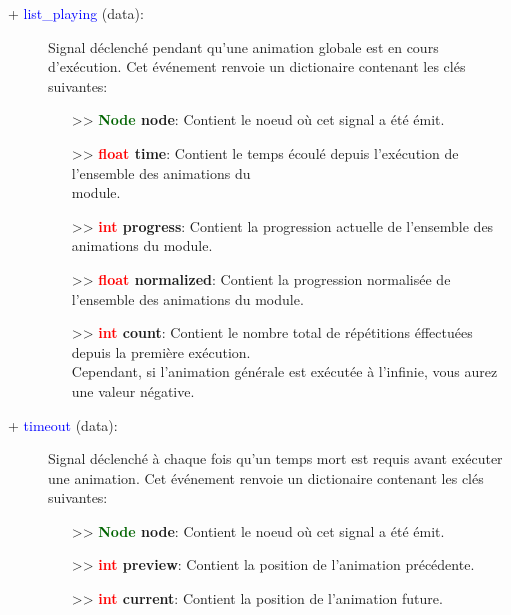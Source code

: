 \documentclass[a4paper, 11pt]{article}
\begin{document}
	\begin{description}
		\item [+ \textcolor{blue}{list\_playing} (data):] Signal déclenché pendant qu'une animation globale 
		est en cours \\d'exécution. Cet événement renvoie un dictionaire contenant les clés suivantes:
		\begin{itemize}
			\item [>> \textbf{\textcolor{darkgreen}{Node} node}:] Contient le noeud où cet signal a été 
			émit.
			\item [>> \textbf{\textcolor{red}{float} time}:] Contient le temps écoulé depuis l'exécution de
			l'ensemble des animations du \\module.
			\item [>> \textbf{\textcolor{red}{int} progress}:] Contient la progression actuelle de 
			l'ensemble des animations du module.
			\item [>> \textbf{\textcolor{red}{float} normalized}:] Contient la progression normalisée de 
			l'ensemble des animations du module.
			\item [>> \textbf{\textcolor{red}{int} count}:] Contient le nombre total de répétitions 
			éffectuées depuis la première exécution. \\Cependant, si l'animation générale est exécutée à 
			l'infinie, vous aurez une valeur négative.\\
		\end{itemize}
	\end{description}
	\begin{description}
		\item [+ \textcolor{blue}{timeout} (data):] Signal déclenché à chaque fois qu'un temps mort est 
		requis avant exécuter une animation. Cet événement renvoie un dictionaire contenant les clés 
		suivantes:
		\begin{itemize}
			\item [>> \textbf{\textcolor{darkgreen}{Node} node}:] Contient le noeud où cet signal a été 
			émit.
			\item [>> \textbf{\textcolor{red}{int} preview}:] Contient la position de l'animation 
			précédente.
			\item [>> \textbf{\textcolor{red}{int} current}:] Contient la position de l'animation future.\\
		\end{itemize}
	\end{description}
\end{document}
